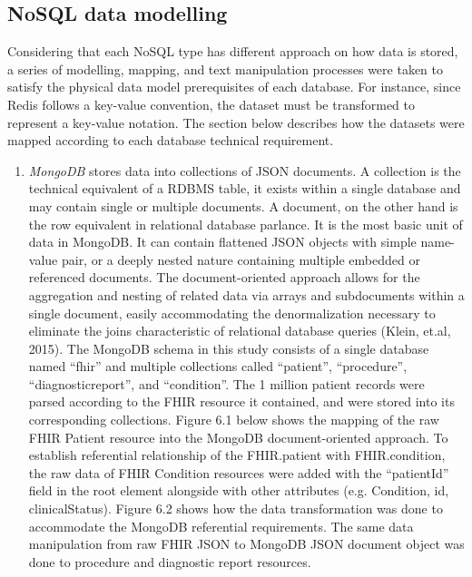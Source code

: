 \documentclass[5p]{elsarticle}
\begin{document}
\subsection{NoSQL data modelling}
Considering that each NoSQL type has different approach on how data is stored,
a series of modelling, mapping, and text manipulation processes were taken to satisfy the physical data model prerequisites of each database. 
For instance, since Redis follows a key-value convention, the dataset must be transformed to represent a key-value notation. 
The section below describes how the datasets were mapped according to each database technical requirement. 

\begin{enumerate}
\item \emph{MongoDB} stores data into collections of JSON documents. A collection is the technical equivalent of a RDBMS table, it exists within a single database and may contain single or multiple documents. A document, on the other hand is the row equivalent in relational database parlance. It is the most basic unit of data in MongoDB. It can contain flattened JSON objects with simple name-value pair, or a deeply nested nature containing multiple embedded or referenced documents. The document-oriented approach allows for the aggregation and nesting of related data via arrays and subdocuments within a single document, easily accommodating the denormalization necessary to eliminate the joins characteristic of relational database queries (Klein, et.al, 2015). The MongoDB schema in this study consists of a single database named “fhir” and multiple collections called “patient”, “procedure”, “diagnosticreport”, and “condition”. The 1 million patient records were parsed according to the FHIR resource it contained, and were stored into its corresponding collections. Figure 6.1 below shows the mapping of the raw FHIR Patient resource into the MongoDB document-oriented approach. 
To establish referential relationship of the FHIR.patient with FHIR.condition, the raw data of FHIR Condition resources were added with the “patientId” field in the root element alongside with other attributes (e.g. Condition, id, clinicalStatus). Figure 6.2 shows how the data transformation was done to accommodate the MongoDB referential requirements. The same data manipulation from raw FHIR JSON to MongoDB JSON document object was done to procedure and diagnostic report resources.
\\

\end{enumerate}
\end{document}
